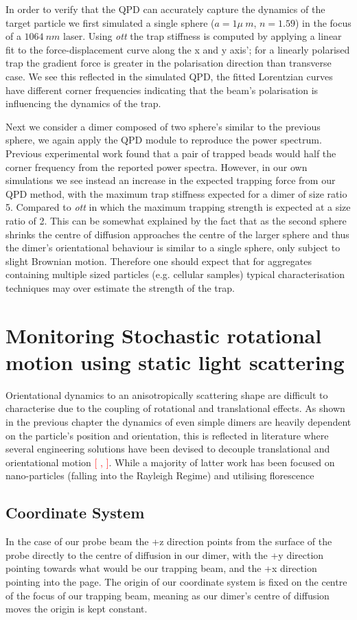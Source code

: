 In order to verify that the QPD can accurately capture the dynamics of the target particle we first simulated a single sphere ($a = 1\mu\ m$, $n=1.59$) in the focus of a $1064\ nm$ laser. Using \textit{ott} the trap stiffness is computed by applying a linear fit to the force-displacement curve along the x and y axis'; for a linearly polarised trap the gradient force is greater in the polarisation direction than transverse case. We see this reflected in the simulated QPD, the fitted Lorentzian curves have different corner frequencies indicating that the beam's polarisation is influencing the dynamics of the trap. 

Next we consider a dimer composed of two sphere's similar to the previous sphere, we again apply the QPD module to reproduce the power spectrum. Previous experimental work found that a pair of trapped beads would half the corner frequency from the reported power spectra. However, in our own simulations we see instead an increase in the expected trapping force from our QPD method, with the maximum trap stiffness expected for a dimer of size ratio 5. Compared to \textit{ott} in which the maximum trapping strength is expected at a size ratio of 2. This can be somewhat explained by the fact that as the second sphere shrinks the centre of diffusion approaches the centre of the larger sphere and thus the dimer's orientational behaviour is similar to a single sphere, only subject to slight Brownian motion. Therefore one should expect that for aggregates containing multiple sized particles (e.g. cellular samples) typical characterisation techniques may over estimate the strength of the trap.

\section{Monitoring Stochastic rotational motion using static light scattering}
Orientational dynamics to an anisotropically scattering shape are difficult to characterise due to the coupling of rotational and translational effects. As shown in the previous chapter the dynamics of even simple dimers are heavily dependent on the particle's position and orientation, this is reflected in literature where several engineering solutions have been devised to decouple translational and orientational motion \textcolor{red}{[ , ]}. While a majority of latter work has been focused on nano-particles (falling into the Rayleigh Regime) and utilising florescence 

\subsection{Coordinate System}
In the case of our probe beam the +z direction points from the surface of the probe directly to the centre of diffusion in our dimer, with the +y direction pointing towards what would be our trapping beam, and the +x direction pointing into the page. The origin of our coordinate system is fixed on the centre of the focus of our trapping beam, meaning as our dimer's centre of diffusion moves the origin is kept constant.

